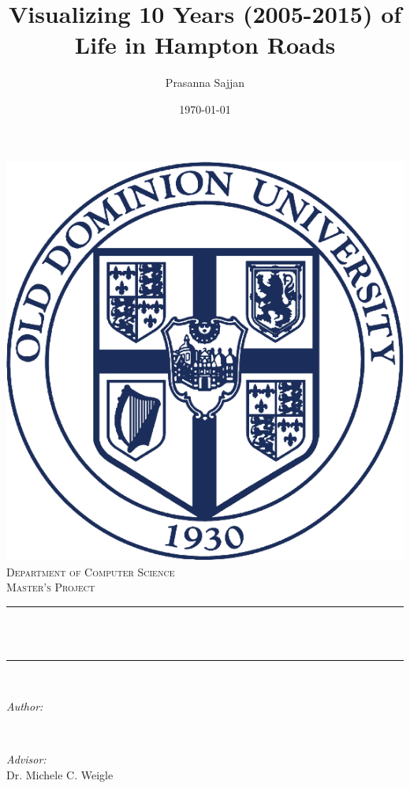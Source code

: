 \documentclass[12pt]{article}
\title{Visualizing 10 Years (2005-2015) of Life in Hampton Roads}								%
\author{Prasanna Sajjan}								%
\date{\today}											%
\makeatletter
\let\thetitle\@title
\let\theauthor\@author
\let\thedate\@date
\makeatother
\begin{document}

\begin{titlepage}
	\centering
    \vspace*{0.5 cm}
    \includegraphics[scale = 0.75]{ODU.png}\\[1.0 cm]	%
    \textsc{\LARGE Department of Computer Science}\\[2.0 cm]	%
	\textsc{\Large Master's Project}\\[0.5 cm]				%
	\rule{\linewidth}{0.2 mm} \\[0.4 cm]
	{ \huge \bfseries \thetitle}\\
	\rule{\linewidth}{0.2 mm} \\[1.5 cm]
	
	\begin{minipage}{0.4\textwidth}
		\begin{flushleft} \large
			\emph{Author:}\\
			\theauthor
			\end{flushleft}
			\end{minipage}~
			\begin{minipage}{0.4\textwidth}
			\begin{flushright} \large
			\emph{Advisor:} \\
			Dr. Michele C. Weigle									%
		\end{flushright}
	\end{minipage}\\[3 cm]
	
	{\large \thedate}\\[2 cm]
 
	\vfill
	
\end{titlepage}
\end{document}
